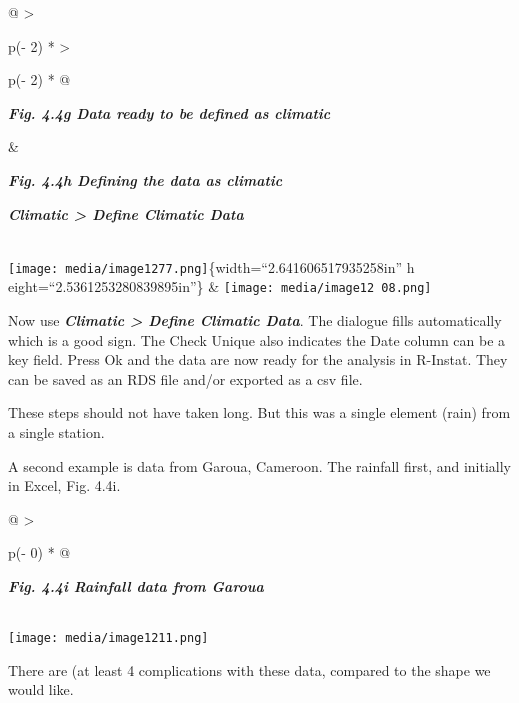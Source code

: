 \documentclass[
  letterpaper,
  DIV=11,
  numbers=noendperiod]{scrreprt}
\begin{document}
\begin{longtable}[]{@{}
  >{\raggedright\arraybackslash}p{(\columnwidth - 2\tabcolsep) * }
  >{\raggedright\arraybackslash}p{(\columnwidth - 2\tabcolsep) * }@{}}
\toprule\noalign{}
\begin{minipage}[b]{\linewidth}\raggedright
\textbf{\emph{Fig. 4.4g Data ready to be defined as climatic}}
\end{minipage} & \begin{minipage}[b]{\linewidth}\raggedright
\textbf{\emph{Fig. 4.4h Defining the data as climatic}}

\textbf{\emph{Climatic \textgreater{} Define Climatic Data}}
\end{minipage} \\
\midrule\noalign{}
\endhead
\bottomrule\noalign{}
\endlastfoot
\texttt{[image: media/image1277.png]}\{width=``2.641606517935258in'' h
eight=``2.5361253280839895in''\} &
\texttt{[image: media/image12 08.png]} \\
\end{longtable}

Now use \textbf{\emph{Climatic \textgreater{} Define Climatic Data}}.
The dialogue fills automatically which is a good sign. The Check Unique
also indicates the Date column can be a key field. Press Ok and the data
are now ready for the analysis in R-Instat. They can be saved as an RDS
file and/or exported as a csv file.

These steps should not have taken long. But this was a single element
(rain) from a single station.

A second example is data from Garoua, Cameroon. The rainfall first, and
initially in Excel, Fig. 4.4i.

\begin{longtable}[]{@{}
  >{\raggedright\arraybackslash}p{(\columnwidth - 0\tabcolsep) * }@{}}
\toprule\noalign{}
\begin{minipage}[b]{\linewidth}\raggedright
\textbf{\emph{Fig. 4.4i Rainfall data from Garoua}}
\end{minipage} \\
\midrule\noalign{}
\endhead
\bottomrule\noalign{}
\endlastfoot
\texttt{[image: media/image1211.png]} \\
\end{longtable}

There are (at least 4 complications with these data, compared to the
shape we would like.
\end{document}
